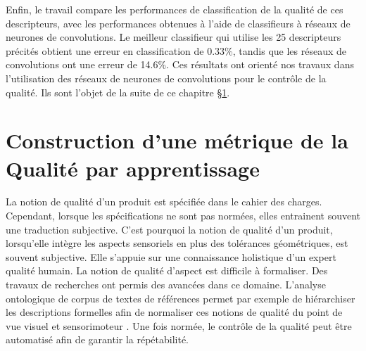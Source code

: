 Enfin, le travail \cite{nagorny_quality_2017} compare les performances de classification de la qualité de ces descripteurs, avec les performances obtenues à l'aide de classifieurs à réseaux de neurones de convolutions.
Le meilleur classifieur qui utilise les 25 descripteurs précités obtient une erreur en classification de 0.33\%, tandis que les réseaux de convolutions ont une erreur de 14.6\%.
Ces résultats ont orienté nos travaux dans l'utilisation des réseaux de neurones de convolutions pour le contrôle de la qualité.
Ils sont l'objet de la suite de ce chapitre §\ref{sec:metric_learning}.

%

\section{Construction d'une métrique de la Qualité par apprentissage} \label{sec:metric_learning}
La notion de qualité d'un produit est spécifiée dans le cahier des charges.
Cependant, lorsque les spécifications ne sont pas normées, elles entrainent souvent une traduction subjective.
C'est pourquoi la notion de qualité d'un produit, lorsqu'elle intègre les aspects sensoriels en plus des tolérances géométriques, est souvent subjective.
Elle s'appuie sur une connaissance holistique d'un expert qualité humain. La notion de qualité d'aspect est difficile à formaliser.
Des travaux de recherches ont permis des avancées dans ce domaine.
L'analyse ontologique de corpus de textes de références permet par exemple de hiérarchiser les descriptions formelles afin de normaliser ces notions de qualité du point de vue visuel \cite{baudet_maitrise_2012} et sensorimoteur \cite{albert_smart_2017}.
Une fois normée, le contrôle de la qualité peut être automatisé \cite{desage_contraintes_2015, pitard_metrologie_2016, lacombe_exploitation_2018a, albert_maitrise_2019} afin de garantir la répétabilité.

